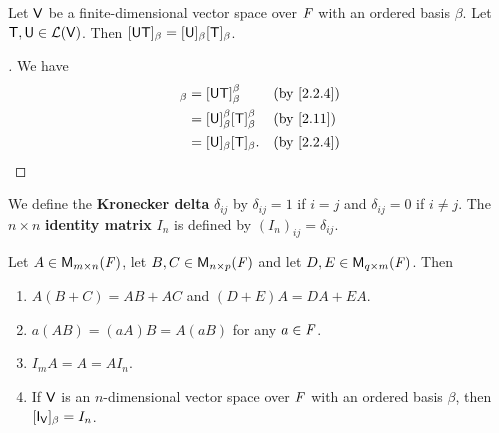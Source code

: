 \begin{cor}\label{2.3.3}
  Let \(\mathsf{V}\) be a finite-dimensional vector space over \(\mathit{F}\) with an ordered basis \(\beta\).
  Let \(\mathsf{T}, \mathsf{U} \in \mathcal{L}(\mathsf{V})\).
  Then \([\mathsf{U} \mathsf{T}]_{\beta} = [\mathsf{U}]_{\beta} [\mathsf{T}]_{\beta}\).
\end{cor}

\begin{proof}[]
  We have
  \begin{align*}
    [\U \T]_{\beta} & = [\U \T]_{\beta}^{\beta}                   &  & \by{2.2.4} \\
                    & = [\U]_{\beta}^{\beta} [\T]_{\beta}^{\beta} &  & \by{2.11}  \\
                    & = [\U]_{\beta} [\T]_{\beta}.                &  & \by{2.2.4}
  \end{align*}
\end{proof}

\begin{defn}\label{2.3.4}
  We define the \textbf{Kronecker delta} \(\delta_{i j}\) by \(\delta_{i j} = 1\) if \(i = j\) and \(\delta_{i j} = 0\) if \(i \neq j\).
  The \(n \times n\) \textbf{identity matrix} \(I_n\) is defined by \((I_n)_{i j} = \delta_{i j}\).
\end{defn}

\begin{thm}\label{2.12}
  Let \(A \in \ms\), let \(B, C \in \ms[n][p][\F]\) and let \(D, E \in \ms[q][m][\F]\).
  Then
  \begin{enumerate}
    \item \(A (B + C) = AB + AC\) and \((D + E) A = DA + EA\).
    \item \(a (AB) = (aA) B = A (aB)\) for any \(a \in \mathit{F}\).
    \item \(I_m A = A = A I_n\).
    \item If \(\mathsf{V}\) is an \(n\)-dimensional vector space over \(\mathit{F}\) with an ordered basis \(\beta\), then \([\IT[\V]]_{\beta} = I_n\).
  \end{enumerate}
\end{thm}

